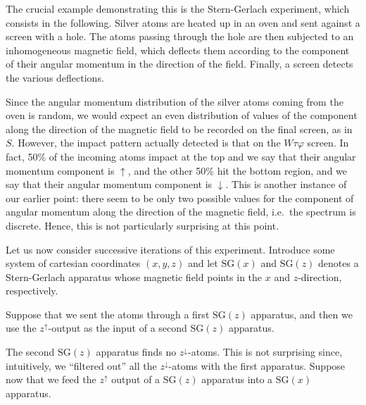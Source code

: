 \begin{enumerate}[label=(\alph*)]
    The crucial example demonstrating this is the Stern-Gerlach experiment, which consists in the following. Silver atoms are heated up in an oven and sent against a screen with a hole. The atoms passing through the hole are then subjected to an inhomogeneous magnetic field, which deflects them according to the component of their angular momentum in the direction of the field. Finally, a screen detects the various deflections.

    \begin{center}
        
    \end{center}

    Since the angular momentum distribution of the silver atoms coming from the oven is random, we would expect an even distribution of values of the component along the direction of the magnetic field to be recorded on the final screen, as in $S$. However, the impact pattern actually detected is that on the $W\tau\varphi$ screen. In fact, 50\% of the incoming atoms impact at the top and we say that their angular momentum component is $\uparrow$, and the other 50\% hit the bottom region, and we say that their angular momentum component is $\downarrow$.  This is another instance of our earlier point: there seem to be only two possible values for the component of angular momentum along the direction of the magnetic field, i.e.\ the spectrum is discrete. Hence, this is not particularly surprising at this point.

    Let us now consider successive iterations of this experiment. Introduce some system of cartesian coordinates $(x,y,z)$ and let $\mathrm{SG}(x)$ and $\mathrm{SG}(z)$ denotes a Stern-Gerlach apparatus whose magnetic field points in the $x$ and $z$-direction, respectively.

    Suppose that we sent the atoms through a first $\mathrm{SG}(z)$ apparatus, and then we use the $z^\uparrow$-output as the input of a second $\mathrm{SG}(z)$ apparatus.
    \begin{center}
        
    \end{center}

    The second $\mathrm{SG}(z)$ apparatus finds no $z^\downarrow$-atoms. This is not surprising since, intuitively, we ``filtered out'' all the $z^\downarrow$-atoms with the first apparatus. Suppose now that we feed the $z^\uparrow$ output of a $\mathrm{SG}(z)$ apparatus into a $\mathrm{SG}(x)$ apparatus.


\end{enumerate}
